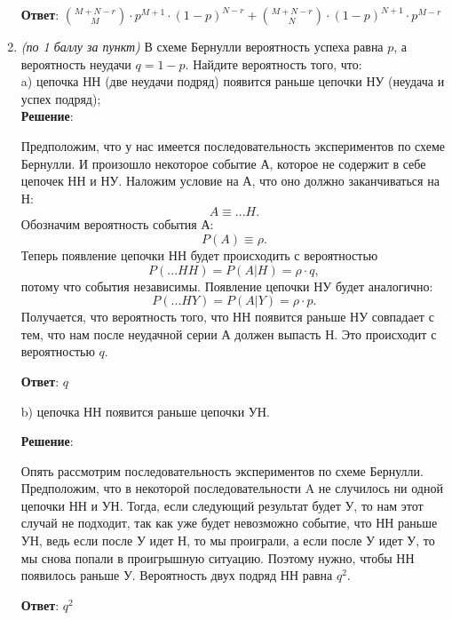 \documentclass{article}
\begin{document}
\begin{enumerate}
    \textbf{Ответ}:
    $\binom{M+N-r}{M} \cdot p^{M+1} \cdot (1-p)^{N-r} + \binom{M+N-r}{N} \cdot (1-p)^{N+1} \cdot p^{M-r}$
    
    \item \textit{(по 1 баллу за пункт)}  В схеме Бернулли вероятность успеха равна $p$, а вероятность неудачи $q = 1-p$. Найдите вероятность того, что:\\
    a) цепочка НН (две неудачи подряд) появится раньше цепочки НУ (неудача и успех подряд);\\
    \textbf{Решение}:

    Предположим, что у нас имеется последовательность экспериментов по схеме Бернулли. И произошло некоторое событие А, которое не содержит в себе цепочек НН и НУ. Наложим условие на А, что оно должно заканчиваться на Н:
    \begin{equation}
        A \equiv ...H.
    \end{equation}
    Обозначим вероятность события А:
    \begin{equation}
        P(A) \equiv \rho.
    \end{equation}
    Теперь появление цепочки НН будет происходить с вероятностью
    \begin{equation}
        P(...HH) = P(A|H) = \rho \cdot q,
    \end{equation}
    потому что события независимы. Появление цепочки НУ будет аналогично:
    \begin{equation}
        P(...HY) = P(A|Y) = \rho \cdot p.
    \end{equation}
    Получается, что вероятность того, что НН появится раньше НУ совпадает с тем, что нам после неудачной серии А должен выпасть Н. Это происходит с вероятностью $q$.

    \textbf{Ответ}:
    $q$

    b) цепочка НН появится раньше цепочки УН.

    \textbf{Решение}:

    Опять рассмотрим последовательность экспериментов по схеме Бернулли. Предположим, что в некоторой последовательности A не случилось ни одной цепочки НН и УН. Тогда, если следующий результат будет У, то нам этот случай не подходит, так как уже будет невозможно событие, что НН раньше УН, ведь если после У идет Н, то мы проиграли, а если после У идет У, то мы снова попали в проигрышную ситуацию. Поэтому нужно, чтобы НН появилось раньше У. Вероятность двух подряд НН равна $q^2$.

    \textbf{Ответ}:
    $q^2$
    

\end{enumerate}
\end{document}

